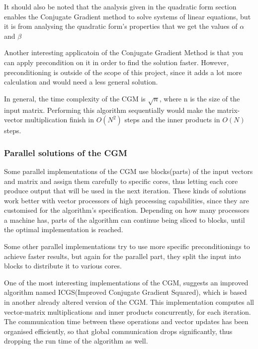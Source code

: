 \documentclass[12pt,a4paper]{article}
\begin{document}
It should also be noted that the analysis given in the quadratic form section enables the Conjugate Gradient method to solve systems of linear equations, but it is from analysing the quadratic form's properties that we get the values of $\alpha$ and $\beta$\cite{press2007numerical}\cite{shewchuk1994introduction}\cite{cgm2009lec}

Another interesting applicatoin of the Conjugate Gradient Method is that you can apply precondition on it in order to find the solution faster. However, preconditioning is outside of the scope of this project, since it adds a lot more calculation and would need a less general solution.

In general, the time complexity of the CGM is $\sqrt{n}$, where n is the size of the input matrix. Performing this algorithm sequentially would make the matrix-vector multiplication finish in $O(N^2)$ steps and the inner products in $O(N)$ steps.
\subsubsection{Parallel solutions of the CGM}

Some parallel implementations of the CGM use blocks(parts) of the input vectors and matrix and assign them carefully to specific cores, thus letting each core produce output that will be used in the next iteration. These kinds of solutions work better with vector processors of high processing capabilities, since they are customised for the algorithm's specification. Depending on how many processors a machine has, parts of the algorithm can continue being sliced to blocks, until the optimal implementation is reached\cite{o1987parallel}.

Some other parallel implementations try to use more specific preconditionings to achieve faster results, but again for the parallel part, they split the input into blocks to distribute it to various cores\cite{adams1985m}\cite{adams1983m}. 

One of the most interesting implementations of the CGM, suggests an improved algorithm named ICGS(Improved Conjugate Gradient Squared), which is based in another already altered version of the CGM\cite{maheswaran1999mcgs}. This implementation computes all vector-matrix  multiplications and inner products concurrently, for each iteration. The communication time between these operations and vector updates has been organised efficiently, so that global communication drops significantly, thus dropping the run time of the algorithm as well\cite{yang2001improved}.
\end{document}
